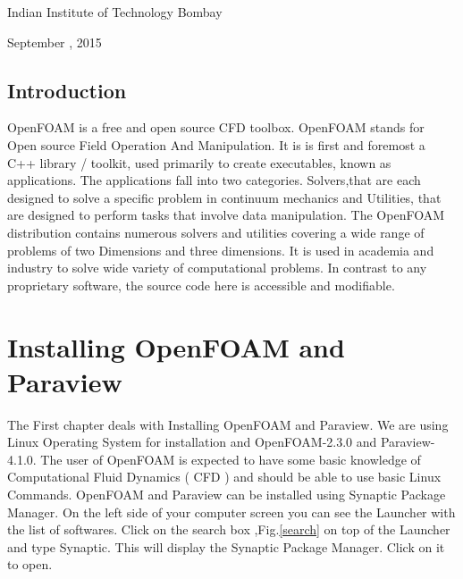 \documentclass[a4paper,12pt]{report}
\begin{document}
\begin{titlepage}
\begin{figure}[h]
\begin{center}
\end{center}  
\end{figure}
\begin{center}Indian Institute of Technology Bombay\end{center}
\begin{center}September , 2015\end{center}
\end{titlepage}    

\tableofcontents
{}
\begingroup
\listoffigures
\endgroup
{}
\begin{flushleft}
\chapter{Introduction}
\end{flushleft}
OpenFOAM is a free and open source CFD toolbox. OpenFOAM stands for Open source Field
Operation And Manipulation. It is is first and foremost a C++ library / toolkit, used primarily to create executables, known as applications. The applications fall into two categories. Solvers,that are each designed to solve a specific problem in continuum mechanics and Utilities, that are designed to perform tasks that involve data manipulation.
The OpenFOAM distribution contains numerous solvers and utilities covering a wide range of problems of two Dimensions and three dimensions. It is used in academia and industry to solve wide variety of computational problems. In contrast to any proprietary software, the source code here is accessible and modifiable.


\newpage
\chapter{Installing OpenFOAM and Paraview}
\flushleft The First chapter deals with Installing OpenFOAM and Paraview. We are using Linux Operating System for installation and OpenFOAM-2.3.0 and Paraview-4.1.0.
\flushleft The user of OpenFOAM is expected to have some basic knowledge of Computational Fluid Dynamics ( CFD ) and should be able to use basic Linux Commands.
\flushleft OpenFOAM and Paraview can be installed using Synaptic Package Manager. On the left side of your computer screen you can see the Launcher with the list of softwares.
\flushleft Click on the search box ,Fig.\ref{search} on top of the Launcher and type Synaptic. This will display the Synaptic Package Manager. Click on it to open.
\end{document}
